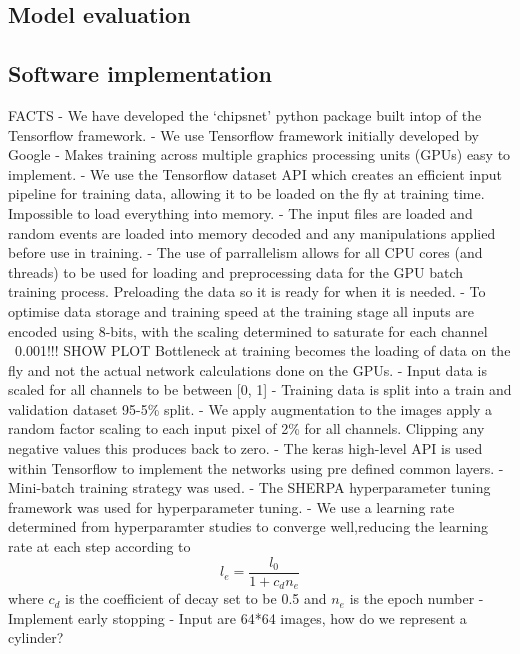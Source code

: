 \subsection{Model evaluation} %
\label{sec:cvn_baseline_soft} %

\subsection{Software implementation} %
\label{sec:cvn_baseline_soft} %

FACTS
- We have developed the `chipsnet' python package built intop of the Tensorflow framework.
- We use Tensorflow framework initially developed by Google
- Makes training across multiple graphics processing units (GPUs) easy to implement.
- We use the Tensorflow dataset API which creates an efficient input pipeline for training data,
allowing it to be loaded on the fly at training time. Impossible to load everything into memory.
- The input files are loaded and random events are loaded into memory decoded and any
manipulations applied before use in training.
- The use of parrallelism allows for all CPU cores (and threads) to be used for loading and
preprocessing data for the GPU batch training process. Preloading the data so it is ready for when
it is needed.
- To optimise data storage and training speed at the training stage all inputs are encoded using
8-bits, with the scaling determined to saturate for each channel ~0.001!!! SHOW PLOT Bottleneck at
training becomes the loading of data on the fly and not the actual network calculations done on
the GPUs.
- Input data is scaled for all channels to be between [0, 1]
- Training data is split into a train and validation dataset 95-5\% split.
- We apply augmentation to the images apply a random factor scaling to each input pixel of
2\% for all channels. Clipping any negative values this produces back to zero.
- The keras high-level API is used within Tensorflow to implement the networks using pre defined
common layers.
- Mini-batch training strategy was used.
- The SHERPA hyperparameter tuning framework was used for hyperparameter tuning.
- We use a learning rate determined from hyperparamter studies to converge well,reducing the
learning rate at each step according to
\begin{equation}
    l_{e}=\frac{l_{0}}{1+c_{d}n_{e}}
\end{equation}
where $c_{d}$ is the coefficient of decay set to be 0.5 and $n_{e}$ is the epoch number
- Implement early stopping
- Input are 64*64 images, how do we represent a cylinder?

